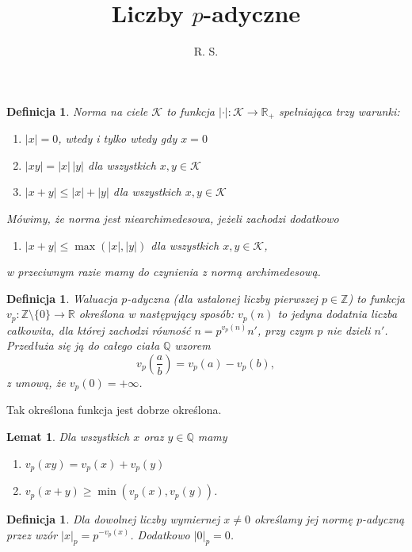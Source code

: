 \documentclass[a4paper, fleqn]{extreport}
\author{R. S.}
\title{Liczby $p$-adyczne}
\newcounter{dummy}
\numberwithin{dummy}{section}
\newtheorem{lemat}[dummy]{Lemat}
\newtheorem{definicja}[dummy]{Definicja}
\begin{document}
\maketitle
\tableofcontents

\begin{definicja}
Norma na ciele $\mathcal K$ to funkcja $| \cdot | \colon \mathcal K \to \mathbb R_+$ spełniająca trzy warunki:
\begin{enumerate}
\item $|x| = 0$, wtedy i tylko wtedy gdy $x = 0$
\item $|xy| = |x|\, |y|$ dla wszystkich $x, y \in \mathcal K$
\item $|x+y| \le |x| + |y|$ dla wszystkich $x, y \in \mathcal K$
\end{enumerate}
Mówimy, że norma jest niearchimedesowa, jeżeli zachodzi dodatkowo
\begin{enumerate}
\item [4.] $|x+y| \le \max(|x|,|y|)$ dla wszystkich $x, y \in \mathcal K$,
\end{enumerate}
w przeciwnym razie mamy do czynienia z normą archimedesową.
\end{definicja}

\begin{definicja}
Waluacja $p$-adyczna (dla ustalonej liczby pierwszej $p \in \mathbb Z$) to funkcja $v_p \colon \mathbb Z \setminus \{0\} \to \mathbb R$ określona w następujący sposób: $v_p(n)$ to jedyna dodatnia liczba całkowita, dla której zachodzi równość $n = p^{v_p(n)} n'$, przy czym $p$ nie dzieli $n'$.
Przedłuża się ją do całego ciała $\mathbb Q$ wzorem
	\[
		v_p\left(\dfrac a b\right) = v_p(a) - v_p(b),
	\]
	z umową, że $v_p(0) = + \infty$.
\end{definicja}

Tak określona funkcja jest dobrze określona.

\begin{lemat}
Dla wszystkich $x$ oraz $y \in \mathbb Q$ mamy
\begin{enumerate}
\item $v_p(xy) = v_p(x) + v_p(y)$
\item $v_p(x + y) \ge \min(v_p(x), v_p(y))$.
\end{enumerate}
\end{lemat}


\begin{definicja}
	Dla dowolnej liczby wymiernej $x \neq 0$ określamy jej normę $p$-adyczną przez wzór $|x|_p = p^{-v_p(x)}$.
	Dodatkowo $|0|_p = 0$.
\end{definicja}
\end{document}
